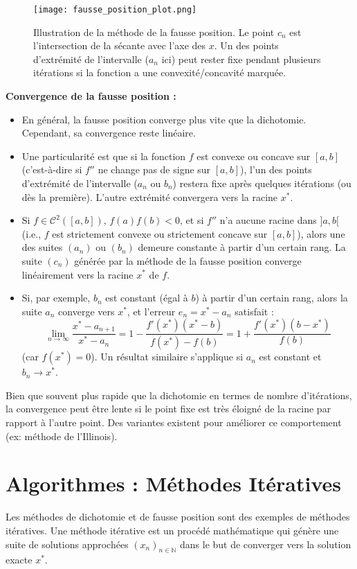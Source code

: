\begin{figure}[H]
\centering
\texttt{[image: fausse\_position\_plot.png]}
\caption{Illustration de la méthode de la fausse position. Le point $c_n$ est l'intersection de la sécante avec l'axe des $x$. Un des points d'extrémité de l'intervalle ($a_n$ ici) peut rester fixe pendant plusieurs itérations si la fonction a une convexité/concavité marquée.}
\label{fig:fausse_position_plot}
\end{figure}

\textbf{Convergence de la fausse position :}
\begin{itemize}
    \item En général, la fausse position converge plus vite que la dichotomie. Cependant, sa convergence reste linéaire.
    \item Une particularité est que si la fonction $f$ est convexe ou concave sur $[a,b]$ (c'est-à-dire si $f''$ ne change pas de signe sur $[a,b]$), l'un des points d'extrémité de l'intervalle ($a_n$ ou $b_n$) restera fixe après quelques itérations (ou dès la première). L'autre extrémité convergera vers la racine $x^*$.
    \item \begin{proposition}
    Si $f \in \mathcal{C}^2([a,b])$, $f(a)f(b)<0$, et si $f''$ n'a aucune racine dans $]a,b[$ (i.e., $f$ est strictement convexe ou strictement concave sur $[a,b]$), alors une des suites $(a_n)$ ou $(b_n)$ demeure constante à partir d'un certain rang. La suite $(c_n)$ générée par la méthode de la fausse position converge linéairement vers la racine $x^*$ de $f$.
    \end{proposition}
    \item Si, par exemple, $b_n$ est constant (égal à $b$) à partir d'un certain rang, alors la suite $a_n$ converge vers $x^*$, et l'erreur $e_n = x^* - a_n$ satisfait :
    \[ \lim_{n\to\infty} \frac{x^* - a_{n+1}}{x^* - a_n} = 1 - \frac{f'(x^*)(x^*-b)}{f(x^*)-f(b)} = 1 + \frac{f'(x^*)(b-x^*)}{f(b)} \]
    (car $f(x^*)=0$). Un résultat similaire s'applique si $a_n$ est constant et $b_n \to x^*$.
\end{itemize}
Bien que souvent plus rapide que la dichotomie en termes de nombre d'itérations, la convergence peut être lente si le point fixe est très éloigné de la racine par rapport à l'autre point. Des variantes existent pour améliorer ce comportement (ex: méthode de l'Illinois).

\section{Algorithmes : Méthodes Itératives}
Les méthodes de dichotomie et de fausse position sont des exemples de méthodes itératives. Une méthode itérative est un procédé mathématique qui génère une suite de solutions approchées $(x_n)_{n \in \mathbb{N}}$ dans le but de converger vers la solution exacte $x^*$.

